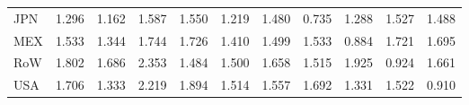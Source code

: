 \begin{table}[htbp]
\begin{tabular}{lcccccccccc}
  JPN & \textcolor[RGB]{214,139,41}{1.296} & \textcolor[RGB]{227,147,28}{1.162} & \textcolor[RGB]{128,82,128}{1.587} & \textcolor[RGB]{135,87,120}{1.550} & \textcolor[RGB]{224,145,31}{1.219} & \textcolor[RGB]{178,115,76}{1.480} & \textcolor[RGB]{252,163,3}{0.735} & \textcolor[RGB]{217,140,38}{1.288} & \textcolor[RGB]{145,94,110}{1.527} & \textcolor[RGB]{163,106,92}{1.488} \\ 
  MEX & \textcolor[RGB]{143,92,112}{1.533} & \textcolor[RGB]{199,129,56}{1.344} & \textcolor[RGB]{69,45,186}{1.744} & \textcolor[RGB]{74,48,181}{1.726} & \textcolor[RGB]{191,124,64}{1.410} & \textcolor[RGB]{161,104,94}{1.499} & \textcolor[RGB]{140,91,115}{1.533} & \textcolor[RGB]{245,158,10}{0.884} & \textcolor[RGB]{77,50,178}{1.721} & \textcolor[RGB]{84,54,171}{1.695} \\ 
  RoW & \textcolor[RGB]{56,36,199}{1.802} & \textcolor[RGB]{94,61,161}{1.686} & \textcolor[RGB]{3,2,252}{2.353} & \textcolor[RGB]{173,112,82}{1.484} & \textcolor[RGB]{158,102,97}{1.500} & \textcolor[RGB]{110,71,145}{1.658} & \textcolor[RGB]{153,99,102}{1.515} & \textcolor[RGB]{25,16,230}{1.925} & \textcolor[RGB]{232,150,23}{0.924} & \textcolor[RGB]{107,69,148}{1.661} \\ 
  USA & \textcolor[RGB]{82,53,173}{1.706} & \textcolor[RGB]{207,134,48}{1.333} & \textcolor[RGB]{5,3,250}{2.219} & \textcolor[RGB]{41,26,214}{1.894} & \textcolor[RGB]{156,101,99}{1.514} & \textcolor[RGB]{130,84,125}{1.557} & \textcolor[RGB]{92,59,163}{1.692} & \textcolor[RGB]{209,135,46}{1.331} & \textcolor[RGB]{148,96,107}{1.522} & \textcolor[RGB]{235,152,20}{0.910} \\ 
   \hline
\end{tabular}
\end{table}
